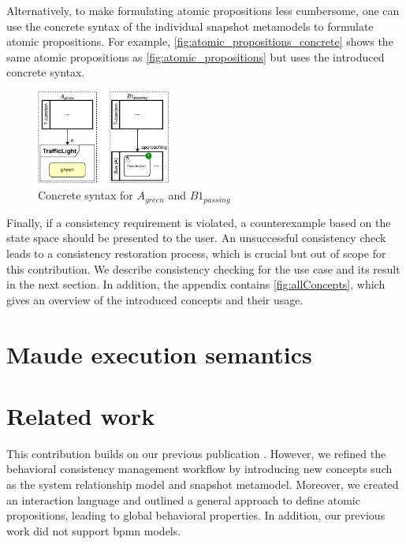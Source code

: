 \documentclass{jot}
\begin{document}
Alternatively, to make formulating atomic propositions less cumbersome, one can use the concrete syntax of the individual snapshot metamodels to formulate atomic propositions.
For example, \autoref{fig:atomic_propositions_concrete} shows the same atomic propositions as \autoref{fig:atomic_propositions} but uses the introduced concrete syntax.

\begin{figure}[h]
    \centering
    \includegraphics[width=0.4\textwidth]{figures/atomic_props_concrete.pdf}
    \caption{Concrete syntax for $A_{green}$ and $B1_{passing}$}
    \label{fig:atomic_propositions_concrete}
\end{figure}

Finally, if a consistency requirement is violated, a counterexample based on the state space should be presented to the user.
An unsuccessful consistency check leads to a consistency restoration process, which is crucial but out of scope for this contribution.
We describe consistency checking for the use case and its result in the next section.
In addition, the appendix contains \autoref{fig:allConcepts}, which gives an overview of the introduced concepts and their usage.

\section{Maude execution semantics} \label{sec:maude_execution_semantics}


\section{Related work} \label{sec:related_work}
This contribution builds on our previous publication \cite{krauterBehavioralConsistencyHeterogeneous2021}.
However, we refined the behavioral consistency management workflow by introducing new concepts such as the system relationship model and snapshot metamodel.
Moreover, we created an interaction language and outlined a general approach to define atomic propositions, leading to global behavioral properties.
In addition, our previous work did not support \gls*{bpmn} models.
\end{document}
